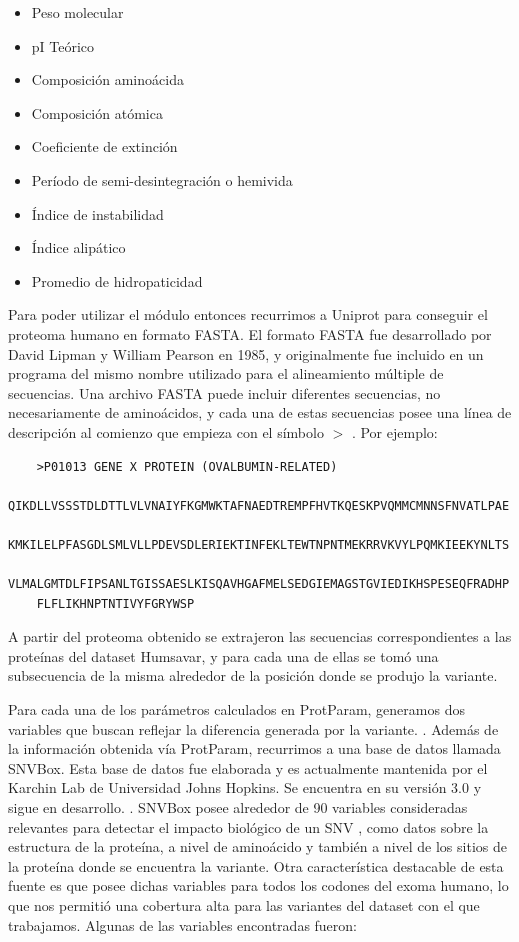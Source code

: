\begin{itemize}
    \item Peso molecular
    \item pI Teórico
    \item Composición aminoácida
    \item Composición atómica
    \item Coeficiente de extinción
    \item Período de semi-desintegración o hemivida
    \item Índice de instabilidad
    \item Índice alipático
    \item Promedio de hidropaticidad
\end{itemize}

Para poder utilizar el módulo entonces recurrimos a Uniprot para conseguir el proteoma humano en formato FASTA. El formato FASTA fue desarrollado por David Lipman y William Pearson en 1985, y originalmente fue incluido en un programa del mismo nombre utilizado para el alineamiento múltiple de secuencias. Una archivo FASTA puede incluir diferentes secuencias, no necesariamente de aminoácidos, y cada una de estas secuencias posee una línea de descripción al comienzo que empieza con el símbolo $>$ \todo{[citar]}. Por ejemplo:

\begin{verbatim}
	>P01013 GENE X PROTEIN (OVALBUMIN-RELATED)
	QIKDLLVSSSTDLDTTLVLVNAIYFKGMWKTAFNAEDTREMPFHVTKQESKPVQMMCMNNSFNVATLPAE
	KMKILELPFASGDLSMLVLLPDEVSDLERIEKTINFEKLTEWTNPNTMEKRRVKVYLPQMKIEEKYNLTS
	VLMALGMTDLFIPSANLTGISSAESLKISQAVHGAFMELSEDGIEMAGSTGVIEDIKHSPESEQFRADHP
	FLFLIKHNPTNTIVYFGRYWSP
\end{verbatim}


A partir del proteoma obtenido se extrajeron las secuencias correspondientes a las proteínas del dataset Humsavar, y para cada una de ellas se tomó una subsecuencia de la misma alrededor de la posición donde se produjo la variante.

\vspace{2mm}
\vspace{2mm}

Para cada una de los parámetros calculados en ProtParam, generamos dos variables que buscan reflejar la diferencia generada por la variante. .
Además de la información obtenida vía ProtParam, recurrimos a una base de datos llamada SNVBox. Esta base de datos fue elaborada y es actualmente mantenida por el Karchin Lab de Universidad Johns Hopkins. Se encuentra en su versión 3.0 y sigue en desarrollo. . SNVBox posee alrededor de 90 variables consideradas relevantes para detectar el impacto biológico de un SNV \cite{Wong2011}, como datos sobre la estructura de la proteína, a nivel de aminoácido y también a nivel de los sitios de la proteína donde se encuentra la variante. Otra característica destacable de esta fuente es que posee dichas variables para todos los codones del exoma humano, lo que nos permitió una cobertura alta para las variantes del dataset con el que trabajamos.
Algunas de las variables encontradas fueron:

